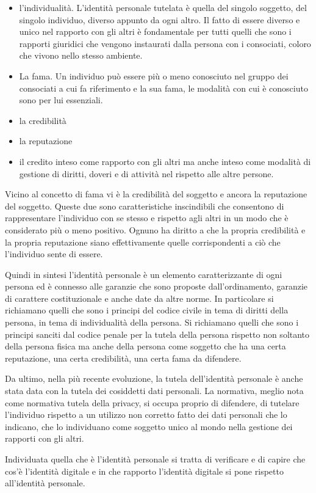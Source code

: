 \begin{itemize}
    \item l'individualità. L'identità personale tutelata è quella del singolo soggetto, del singolo individuo, diverso appunto da ogni altro. Il fatto di essere diverso e unico nel rapporto con gli altri è fondamentale per tutti quelli che sono i rapporti giuridici che vengono instaurati dalla persona con i consociati, coloro che vivono nello stesso ambiente.
    \item La fama. Un individuo può essere più o meno conosciuto nel gruppo dei consociati a cui fa riferimento e la sua fama, le modalità con cui è conosciuto sono per lui essenziali. 
    \item la credibilità
    \item la reputazione
    \item il credito inteso come rapporto con gli altri ma anche inteso come modalità di gestione di diritti, doveri e di attività nel rispetto alle altre persone.
\end{itemize}

Vicino al concetto di fama vi è la credibilità del soggetto e ancora la reputazione del soggetto. Queste due sono caratteristiche inscindibili che consentono di rappresentare l'individuo con se stesso e rispetto agli altri in un modo che è considerato più o meno positivo. Ognuno ha diritto a che la propria credibilità e la propria reputazione siano effettivamente quelle corrispondenti a ciò che l'individuo sente di essere.\par

Quindi in sintesi l'identità personale è un elemento caratterizzante di ogni persona ed è connesso alle garanzie che sono proposte dall'ordinamento, garanzie di carattere costituzionale e anche date da altre norme. In particolare si richiamano quelli che sono i principi del codice civile in tema di diritti della persona, in tema di individualità della persona. Si richiamano quelli che sono i principi sanciti dal codice penale per la tutela della persona rispetto non soltanto della persona fisica ma anche della persona come soggetto che ha una certa reputazione, una certa credibilità, una certa fama da difendere.\par
Da ultimo, nella più recente evoluzione, la tutela dell'identità personale è anche stata data con la tutela dei cosiddetti dati personali. La normativa, meglio nota come normativa tutela della privacy, si occupa proprio di difendere, di tutelare l'individuo rispetto a un utilizzo non corretto fatto dei dati personali che lo indicano, che lo individuano come soggetto unico al mondo nella gestione dei rapporti con gli altri.\par 
Individuata quella che è l'identità personale si tratta di verificare e di capire che cos'è l'identità digitale e in che rapporto l'identità digitale si pone rispetto all'identità personale. 

